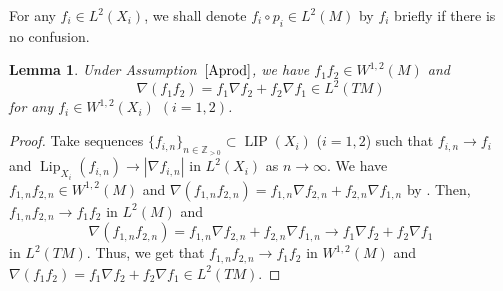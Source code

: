 \documentclass[pdftex]{sigma}
\numberwithin{equation}{section}
\newtheorem{Lem}[Thm]{Lemma}
\theoremstyle{definition}
\newcommand{\LIP}{\operatorname{LIP}}
\newcommand{\Lip}{\operatorname{Lip}}
\newcommand{\Z}{\mathbb{Z}}
\begin{document}
For any $f_i\in L^2(X_i)$, we shall denote $f_i\circ p_i\in L^2(M)$ by $f_i$ briefly if there is no confusion.
\begin{Lem}\label{sbprod}
Under Assumption~$\ref{Aprod}$, we have $f_1 f_2\in W^{1,2}(M)$ and
\[
\nabla (f_1 f_2)=f_1 \nabla f_2+f_2 \nabla f_1\in L^2(T M)
\]
for any $f_i\in W^{1,2}(X_i)$ $(i=1,2)$.
\end{Lem}
\begin{proof}
Take sequences $\{f_{i,n}\}_{n\in \Z_{>0}}\subset \LIP(X_i)$ ($i=1,2$) such that
$f_{i,n}\to f_i$ and $\Lip_{X_i}(f_{i,n})\to |\nabla f_{i,n}|$ in $L^2(X_i)$ as $n\to \infty$.
We have $f_{1,n} f_{2,n}\in W^{1,2}(M)$ and $\nabla (f_{1,n} f_{2,n})=f_{1,n}\nabla f_{2,n} +f_{2,n}\nabla f_{1,n}$ by \cite[Theorem~2.2.6]{Gig}.
Then, $f_{1,n} f_{2,n}\to f_1 f_2$ in $L^2(M)$ and
\[
\nabla (f_{1,n} f_{2,n})=f_{1,n}\nabla f_{2,n} +f_{2,n}\nabla f_{1,n}\to f_1\nabla f_2+f_2\nabla f_1\]
in $L^2(T M)$.
Thus, we get that $f_{1,n} f_{2,n}\to f_1 f_2$ in $W^{1,2}(M)$ and
$\nabla (f_1 f_2)=f_1 \nabla f_2+f_2 \nabla f_1\in L^2(T M)$.
\end{proof}
\end{document}
